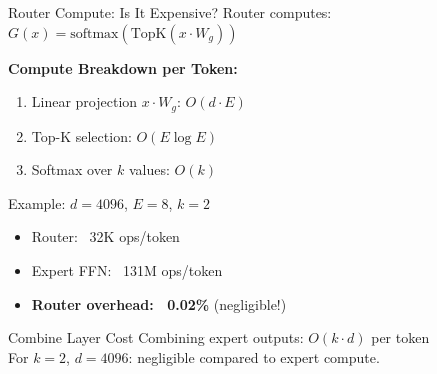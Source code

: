 \documentclass[aspectratio=169,10pt]{beamer}
\begin{document}
\begin{frame}{Router Compute: Is It Expensive?}
    Router computes: $G(x) = \text{softmax}(\text{TopK}(x \cdot W_g))$

    \vspace{0.2cm}
    \textbf{Compute Breakdown per Token:}
    \begin{enumerate}
        \item Linear projection $x \cdot W_g$: $O(d \cdot E)$
        \item Top-K selection: $O(E \log E)$
        \item Softmax over $k$ values: $O(k)$
    \end{enumerate}

    \vspace{0.2cm}
    \begin{block}{Example: $d=4096$, $E=8$, $k=2$}
        \begin{itemize}
            \item Router: ~32K ops/token
            \item Expert FFN: ~131M ops/token
            \item \textbf{Router overhead: ~0.02\%} (negligible!)
        \end{itemize}
    \end{block}

    \vspace{0.2cm}
    \begin{block}{Combine Layer Cost}
        Combining expert outputs: $O(k \cdot d)$ per token \\
        For $k=2$, $d=4096$: negligible compared to expert compute.
    \end{block}
\end{frame}
\end{document}
